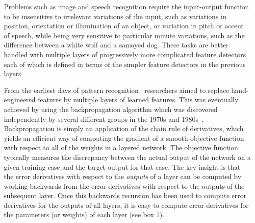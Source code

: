 \documentclass[]{article}
\begin{document}
Problems such as image and speech recognition require the input-output
function to be insensitive to irrelevant variations of the input, such as
variations in position, orientation or illumination of an object, or
variation in pitch or accent of speech, while being very sensitive to
particular minute variations, such as the difference between a white wolf
and a samoyed dog. These tasks are better handled with multiple layers of
progressively more complicated feature detectors each of which is defined
in terms of the simpler feature detectors in the previous layers.

From the earliest days of pattern recognition~\citep{selfridge,Rosenblatt57}
researchers aimed to replace hand-engineered features by multiple layers of
learned features.  This was eventually achieved by using the
backpropagation algorithm which was discovered independently by several
different groups in the 1970s and 1980s~\citep{Werbos74,Parker85,LeCun85,Rumelhart86b,schmidreference}.  
Backpropagation is simply an application of
the chain rule of derivatives,  %
which yields an efficient way of computing the gradient of a
smooth objective function with respect to all of the weights in a layered
network. The objective function typically measures the discrepancy between
the actual output of the network on a given training case and the target
output for that case.  The key insight is that the error derivatives with
respect to the {\it outputs} of a layer can be computed by working
backwards from the error derivatives with respect to the outputs of the
subsequent layer. Once this backwards recursion has been used to compute
error derivatives for the outputs of all layers, it is easy to compute
error derivatives for the parameters (or weights) of each layer (see box
1).
\end{document}

